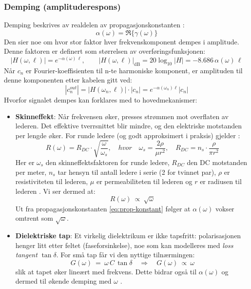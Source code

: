 \clearpage
\subsubsection{Demping (amplituderespons)}
Demping beskrives av realdelen av propagasjonskonstanten \cite{HaytBuck2018}:
\[ 
  \alpha(\omega)=\Re\{\gamma(\omega)\}
\]
Den sier noe om hvor stor faktor hver frekvenskomponent dempes i amplitude. Denne faktoren er definert som størrelsen av overføringsfunksjonen:
\[
|H(\omega,\ell)|=e^{-\alpha(\omega)\,\ell}, \qquad |H(\omega,\ell)|_{\mathrm{dB}} = 20\log_{10}|H| = -8.686\,\alpha(\omega)\,\ell
\]
Når $c_n$ er Fourier-koeffisienten til n-te harmoniske komponent, er amplituden til denne komponenten etter kabelen gitt ved:
\[
|c_n^{out}| = |H(\omega_n,\ell)| \cdot |c _n| = e^{-\alpha(\omega_n) \ell} |c_n|
\]
Hvorfor signalet dempes kan forklares med to hovedmekanismer:\\
\begin{itemize}[leftmargin=2.8em,style=nextline]
  \item \textbf{Skinneffekt}: Når frekvensen øker, presses strømmen mot overflaten av lederen. Det effektive tverrsnittet blir mindre, og den elektriske motstanden per lengde øker. For runde ledere (og godt approksimert i praksis) gjelder :
    \begin{equation}
        R(\omega) = R_{DC} \cdot \sqrt{\frac{\omega}{\omega_{s}}}, \quad hvor \quad \omega_{s} = \frac{2 \rho}{ \mu r^2}, \quad R_{DC} = n_s \cdot \frac{\rho}{\pi r^2}
        \label{eq:skin-effekt}
    \end{equation}
    Her er $\omega_{s}$ den skinneffektsfaktoren for runde ledere, $R_{DC}$ den DC motstanden per meter, $n_s$ tar hensyn til antall ledere i serie (2 for tvinnet par), $\rho$ er resistiviteten til lederen, $\mu$ er permeabiliteten til lederen og $r$ er radiusen til lederen \cite{PalermoLecture2023}. Vi ser dermed at:
    \[
    R(\omega)\ \propto\ \sqrt{\omega}
    \]
  Ut fra propagasjonskonstanten \eqref{eq:prop-konstant} følger at $\alpha(\omega)$ vokser omtrent som $\sqrt{\omega}$.\\
  \item \textbf{Dielektriske tap}: Et virkelig dielektrikum er ikke tapsfritt: polarisasjonen henger litt etter feltet (faseforsinkelse), noe som kan modelleres med \emph{loss tangent} \(\tan\delta\). For små tap får vi den nyttige tilnærmingen:
  \begin{equation}
  G(\omega)\ =\ \omega\,C\,\tan\delta \quad \Rightarrow \quad G(\omega)\ \propto\ \omega
    \label{eq:dielectric_loss}
  \end{equation}
  slik at tapet øker lineært med frekvens. Dette bidrar også til \(\alpha(\omega)\) og dermed til økende demping med \(\omega\) \cite{PalermoLecture2023}.\\
\end{itemize}
\clearpage

